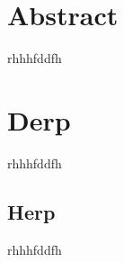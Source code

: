 \documentclass[../../web server admin.tex]{subfiles}
\begin{document}
	\section{Abstract}
	rhhhfddfh
	
	\section*{Derp}
	rhhhfddfh
	
	\subsection*{Herp}
	rhhhfddfh
	
\end{document}

